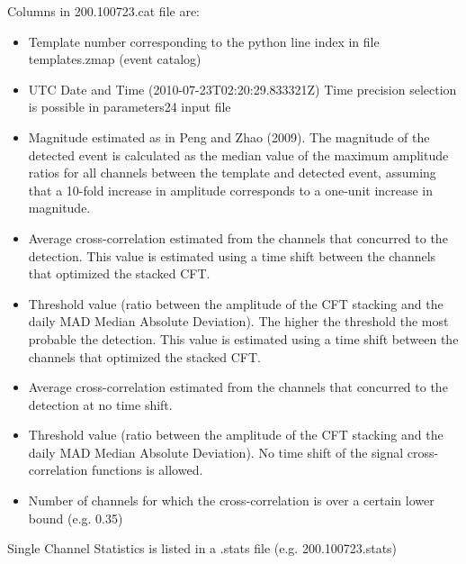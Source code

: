 \documentclass[a4paper,10pt,english]{sphinxmanual}
\begin{document}
Columns in 200.100723.cat file are:
\begin{itemize}
\item {} 
Template number corresponding to the python line index in file templates.zmap (event catalog)

\item {} 
UTC Date and Time (2010-07-23T02:20:29.833321Z) Time precision selection is possible in parameters24 input file

\item {} 
Magnitude estimated as in Peng and Zhao (2009). The magnitude of the detected event is calculated as the median value of the maximum amplitude ratios for all channels between the template and detected event, assuming that a 10-fold increase in amplitude corresponds to a one-unit increase in magnitude.

\item {} 
Average cross-correlation estimated from the channels that concurred to the detection. This value is estimated using a time shift between the channels that optimized the stacked CFT.

\item {} 
Threshold value (ratio between the amplitude of the CFT stacking and the daily MAD Median Absolute Deviation). The higher the threshold the most probable the detection. This value is estimated using a time shift between the channels that optimized the stacked CFT.

\item {} 
Average cross-correlation estimated from the channels that concurred to the detection at no time shift.

\item {} 
Threshold value (ratio between the amplitude of the CFT stacking and the daily MAD Median Absolute Deviation). No time shift of the signal cross-correlation functions is allowed.

\item {} 
Number of channels for which the cross-correlation is over a certain lower bound (e.g. 0.35)

\end{itemize}

Single Channel Statistics is listed in a .stats file (e.g. 200.100723.stats)
\end{document}
